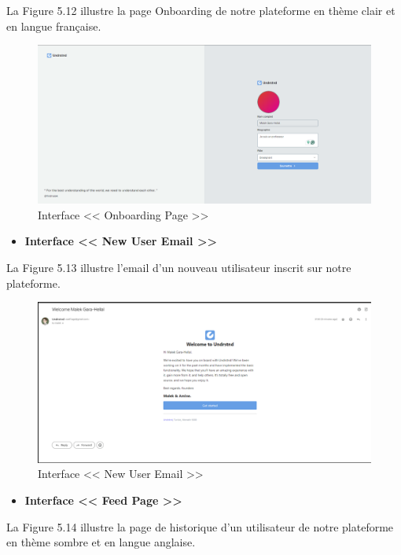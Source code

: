 La Figure 5.12 illustre la page Onboarding de notre plateforme en thème clair et en langue française.
\begin{figure}[H]
    \centering
    \includegraphics[width=1.1\textwidth,height=0.5\textwidth]{images/chp5/fig12.png}
    \caption{Interface << Onboarding Page >>}
    \label{Interface << Onboarding Page >>}    
\end{figure}
\begin{itemize}
    \item \textbf{Interface << New User Email >>}
\end{itemize}
La Figure 5.13 illustre l'email d'un nouveau utilisateur inscrit sur notre plateforme.
\begin{figure}[H]
    \centering
    \includegraphics[width=1.1\textwidth,height=0.5\textwidth]{images/chp5/fig13.png}
    \caption{Interface << New User Email >>}
    \label{Interface << New User Email >>}    
\end{figure}
\begin{itemize}
    \item \textbf{Interface << Feed Page >>}
\end{itemize}
La Figure 5.14 illustre la page de historique d'un utilisateur de notre plateforme en thème sombre et en langue anglaise.
